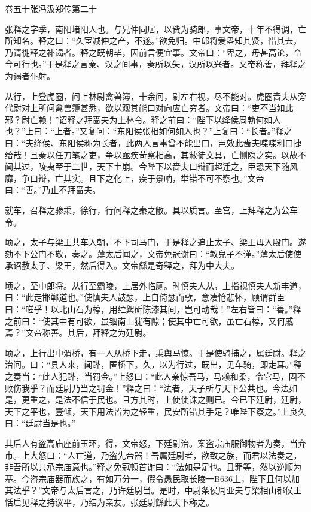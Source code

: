 \documentclass[12pt,UTF8]{ctexbook}
\begin{document}
卷五十张冯汲郑传第二十



张释之字季，南阳堵阳人也。与兄仲同居，以赀为骑郎，事文帝，十年不得调，亡所知名。释之曰：“久宦减仲之产，不遂。”欲免归。中郎将爰盎知其贤，惜其去，乃请徙释之补谒者。释之既朝毕，因前言便宜事。文帝曰：“卑之，毋甚高论，令今可行也。”于是释之言秦、汉之间事，秦所以失，汉所以兴者。文帝称善，拜释之为谒者仆射。



从行，上登虎圈，问上林尉禽兽簿，十余问，尉左右视，尽不能对。虎圈啬夫从旁代尉对上所问禽兽簿甚悉，欲以观其能口对向应亡穷者。文帝曰：“吏不当如此邪？尉亡赖！”诏释之拜啬夫为上林令。释之前曰：“陛下以绛侯周勃何如人也？”上曰：“上者。”又复问：“东阳侯张相如何如人也？”上复曰：“长者。”释之曰：“夫绛侯、东阳侯称为长者，此两人言事曾不能出口，岂效此啬夫喋喋利口捷给哉！且秦以任刀笔之吏，争以亟疾苛察相高，其敝徒文具，亡恻隐之实。以故不闻其过，陵夷至于二世，天下土崩。今陛下以啬夫口辩而超迁之，臣恐天下随风靡，争口辩，亡其实。且下之化上，疾于景响，举错不可不察也。”文帝曰：“善。”乃止不拜啬夫。



就车，召释之骖乘，徐行，行问释之秦之敝。具以质言。至宫，上拜释之为公车令。



顷之，太子与梁王共车入朝，不下司马门，于是释之追止太子、梁王毋入殿门。遂劾不下公门不敬，奏之。薄太后闻之，文帝免冠谢曰：“教兒子不谨。”薄太后使使承诏赦太子、梁王，然后得入。文帝繇是奇释之，拜为中大夫。



顷之，至中郎将。从行至霸陵，上居外临厕。时慎夫人从，上指视慎夫人新丰道，曰：“此走邯郸道也。”使慎夫人鼓瑟，上自倚瑟而歌，意凄怆悲怀，顾谓群臣曰：“嗟乎！以北山石为椁，用纻絮斫陈漆其间，岂可动哉！”左右皆曰：“善。”释之前曰：“使其中有可欲，虽锢南山犹有隙；使其中亡可欲，虽亡石椁，又何戚焉？”文帝称善。其后，拜释之为廷尉。



顷之，上行出中渭桥，有一人从桥下走，乘舆马惊。于是使骑捕之，属廷尉。释之治问。曰：“县人来，闻跸，匿桥下。久，以为行过，既出，见车骑，即走耳。”释之奏当：“此人犯跸，当罚金。”上怒曰：“此人亲惊吾马，马赖和柔，令它马，固不败伤我乎？而廷尉乃当之罚金！”释之曰：“法者，天子所与天下公共也。今法如是，更重之，是法不信于民也。且方其时，上使使诛之则已。今已下廷尉，廷尉，天下之平也，壹倾，天下用法皆为之轻重，民安所错其手足？唯陛下察之。”上良久曰：“廷尉当是也。”



其后人有盗高庙座前玉环，得，文帝怒，下廷尉治。案盗宗庙服御物者为奏，当弃市。上大怒曰：“人亡道，乃盗先帝器！吾属廷尉者，欲致之族，而君以法奏之，非吾所以共承宗庙意也。”释之免冠顿首谢曰：“法如是足也。且罪等，然以逆顺为基。今盗宗庙器而族之，有如万分一，假令愚民取长陵一B636土，陛下且何以加其法乎？”文帝与太后言之，乃许廷尉当。是时，中尉条侯周亚夫与梁相山都侯王恬启见释之持议平，乃结为亲友。张廷尉繇此天下称之。
\end{document}
